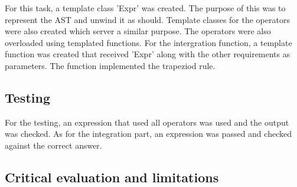 \documentclass[a4paper, 12pt]{report}
\begin{document}
For this task, a template class  'Expr' was created. The purpose of this was to represent the AST and unwind it as should. Template classes for the operators were also created which server a similar purpose. The operators were also overloaded using templated functions.
\linebreak
For the intergration function, a template function was created that received 'Expr' along with the other requirements as parameters. The function implemented the trapeziod rule.

\subsection{Testing}

For the testing, an expression that used all operators was used and the output was checked. As for the integration part, an expression was passed and checked against the correct answer.

\subsection{Critical evaluation and limitations}
\end{document}
